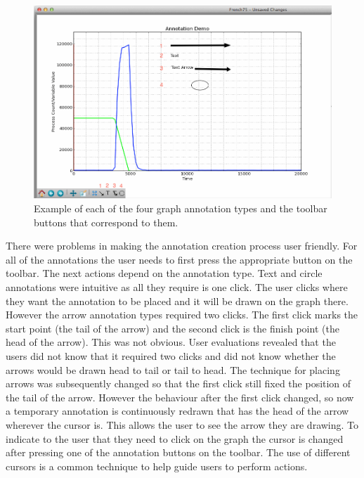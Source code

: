 \begin{figure}[h!]
    \centering
    \includegraphics[width=\textwidth]{images/annotation_demo.png}
    \caption{Example of each of the four graph annotation types and the toolbar buttons that correspond to them.}
    \label{fig:annotation_demo}
\end{figure}

There were problems in making the annotation creation process user friendly.  For all of the annotations the user needs to first press the appropriate button on the toolbar.  The next actions depend on the annotation type.  Text and circle annotations were intuitive as all they require is one click.  The user clicks where they want the annotation to be placed and it will be drawn on the graph there.  However the arrow annotation types required two clicks.  The first click marks the start point (the tail of the arrow) and the second click is the finish point (the head of the arrow).  This was not obvious. User evaluations revealed that the users did not know that it required two clicks and did not know whether the arrows would be drawn head to tail or tail to head.  The technique for placing arrows was subsequently changed so that the first click still fixed the position of the tail of the arrow. However the behaviour after the first click changed, so now a temporary annotation is continuously redrawn that has the head of the arrow wherever the cursor is.  This allows the user to see the arrow they are drawing.  To indicate to the user that they need to click on the graph the cursor is changed after pressing one of the annotation buttons on the toolbar.  The use of different cursors is a common technique to help guide users to perform actions.

